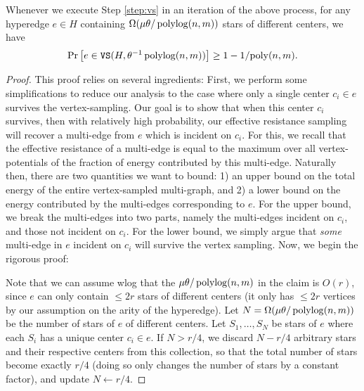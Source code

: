 \documentclass{article}
\begin{document}
\begin{claim}\label{clm:vsr}
    Whenever we execute Step \ref{step:vs} in an iteration of the above process,
    for any hyperedge $e\in H$ containing
    $\Omega(\mu \theta/\operatorname{polylog}(n,m))$ stars
    of different centers, we have
    \begin{align*}
        \mathrm{Pr}\left[ e\in \mathtt{VS}(H, \theta^{-1}\operatorname{polylog}(n,m)) \right] \geq
        1 - 1/\mathrm{poly}(n,m).
    \end{align*}
\end{claim}
\begin{proof}

This proof relies on several ingredients: First, we perform some simplifications to reduce our analysis to the case where only a single center $c_i \in e$ survives the vertex-sampling. Our goal is to show that when this center $c_i$ survives, then with relatively high probability, our effective resistance sampling will recover a multi-edge from $e$ which is incident on $c_i$. For this, we recall that the effective resistance of a multi-edge is equal to the maximum over all vertex-potentials of the fraction of energy contributed by this multi-edge. Naturally then, there are two quantities we want to bound: 1) an upper bound on the total energy of the entire vertex-sampled multi-graph, and 2) a lower bound on the energy contributed by the multi-edges corresponding to $e$. For the upper bound, we break the multi-edges into two parts, namely the multi-edges incident on $c_i$, and those not incident on $c_i$. For the lower bound, we simply argue that \emph{some} multi-edge in $e$ incident on $c_i$ will survive the vertex sampling. Now, we begin the rigorous proof:

Note that we can assume wlog that the $\mu\theta / \operatorname{polylog}(n,m)$ in the claim is
$O(r)$, since $e$ can only contain $\leq 2r$ stars of different centers (it only
has $\leq 2r$ vertices by our assumption on the arity of the hyperedge).
Let $N=\Omega(\mu \theta/\operatorname{polylog}(n,m))$ be the number of stars of $e$ of different centers.
Let $S_1,\ldots,S_{N}$ be stars of $e$ where
    each $S_i$ has a unique center $c_i\in e$.
    If $N > r/4$, we discard $N-r/4$ arbitrary stars and their respective centers
    from this collection, so that the total number of stars become exactly $r/4$
    (doing so only changes the number of stars by a constant factor),
    and update $N\gets r/4$.


\end{proof}
\end{document}
